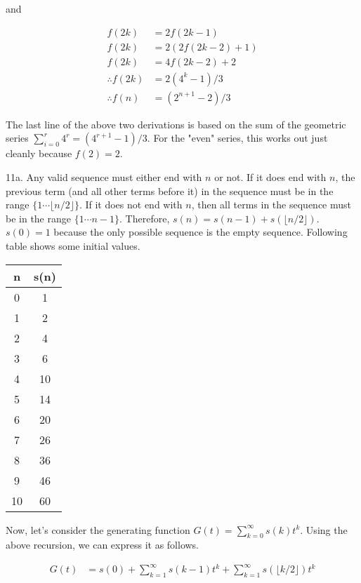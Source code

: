 \documentclass{article}
\begin{document}
and

\begin{align*}
    f(2k) &= 2f(2k - 1) \\
    f(2k) &= 2(2f(2k - 2) + 1) \\
    f(2k) &= 4f(2k - 2) + 2 \\
    \therefore f(2k) &= 2(4^k - 1) / 3 \\
    \therefore f(n) &= (2^{n + 1} - 2) / 3
\end{align*}

The last line of the above two derivations is based on the sum of the geometric series $\sum_{i = 0}^r 4^r = (4^{r + 1} - 1) / 3$. For the "even" series, this works out just cleanly because $f(2) = 2$.

11a. Any valid sequence must either end with $n$ or not. If it does end with $n$, the previous term (and all other terms before it) in the sequence must be in the range $\{1 \cdots \lfloor {n / 2} \rfloor \}$. If it does not end with $n$, then all terms in the sequence must be in the range $\{1 \cdots n - 1\}$. Therefore, $s(n) = s(n - 1) + s(\lfloor {n / 2} \rfloor)$. $s(0) = 1$ because the only possible sequence is the empty sequence. Following table shows some initial values.

\begin{center}
    \begin{tabular}{c c}
        \hline
        n & s(n) \\
        \hline
        0 & 1 \\
        1 & 2 \\
        2 & 4 \\
        3 & 6 \\
        4 & 10 \\
        5 & 14 \\
        6 & 20 \\
        7 & 26 \\
        8 & 36 \\
        9 & 46 \\
        10 & 60
    \end{tabular}
\end{center}

Now, let's consider the generating function $G(t) = \sum_{k = 0}^\infty s(k)t^k$. Using the above recursion, we can express it as follows.


\begin{align*}
    G(t) &= s(0) + \sum_{k = 1}^\infty s(k - 1)t^k + \sum_{k = 1}^\infty s(\lfloor {k / 2} \rfloor)t^k \\
\end{align*}
\end{document}
